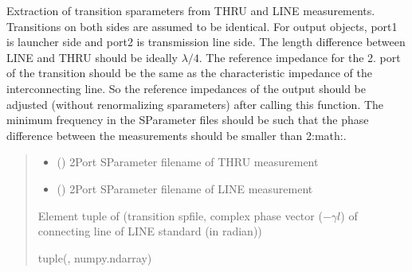 \documentclass[letterpaper,10pt,english]{sphinxmanual}
\begin{document}

\begin{fulllineitems}
\label{\detokenize{touchstone:touchstone.thru_line_deembedding}}
\pysigstartsignatures
{}
\pysigstopsignatures
\sphinxAtStartPar
Extraction of transition s\sphinxhyphen{}parameters from THRU and LINE measurements. Transitions on both sides are assumed to be identical. For output  objects, port\sphinxhyphen{}1 is launcher side and port\sphinxhyphen{}2 is transmission line side. The length difference between LINE and THRU should be ideally \(\lambda/4\).
The reference impedance for the 2. port of the transition should be the same as the characteristic impedance of the interconnecting line. So the reference impedances of the output  should be adjusted (without renormalizing s\sphinxhyphen{}parameters) after calling this function. The minimum frequency in the S\sphinxhyphen{}Parameter files should be such that the phase difference between the measurements should be smaller than 2:math:.
\begin{quote}\begin{description}
\begin{itemize}
\item {}
\sphinxAtStartPar
{} () \textendash{} 2\sphinxhyphen{}Port S\sphinxhyphen{}Parameter filename of THRU measurement

\item {}
\sphinxAtStartPar
{} () \textendash{} 2\sphinxhyphen{}Port S\sphinxhyphen{}Parameter filename of LINE measurement

\end{itemize}

\sphinxhyphen{}Element tuple of (transition spfile, complex phase vector (\(-\gamma l\)) of connecting line of LINE standard (in radian))

\sphinxAtStartPar
tuple({\hyperref[\detokenize{touchstone:touchstone.spfile}]{}}, numpy.ndarray)

\end{description}\end{quote}

\end{fulllineitems}
\end{document}
